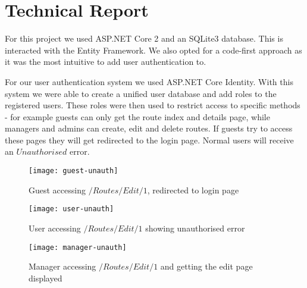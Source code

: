 \chapter{Technical Report}

For this project we used ASP.NET Core 2 and an SQLite3 database. This is
interacted with the Entity Framework. We also opted for a code-first approach as
 it was the most intuitive to add user authentication to.

For our user authentication system we used ASP.NET Core Identity. With this
system we were able to create a unified user database and add roles to the
registered users. These roles were then used to restrict access to specific
methods - for example guests can only get the route index and details page,
while managers and admins can create, edit and delete routes. If guests try to
access these pages they will get redirected to the login page. Normal users will
receive an $Unauthorised$ error.

\begin{figure}[ht]
  \centering
  \texttt{[image: guest-unauth]}
  \caption{Guest accessing $/Routes/Edit/1$, redirected to login page}
\end{figure}

\begin{figure}[ht]
  \centering
  \texttt{[image: user-unauth]}
  \caption{User accessing $/Routes/Edit/1$ showing unauthorised error}
\end{figure}

\begin{figure}[ht]
  \centering
  \texttt{[image: manager-unauth]}
  \caption{Manager accessing $/Routes/Edit/1$ and getting the edit page displayed}
\end{figure}

